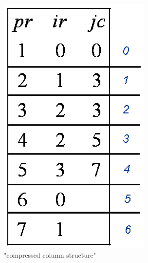 \begin{figure}[htbp]
\begin{center}
\begin{minipage}[t]{0.4\linewidth}
			\includegraphics[width=\linewidth]{../xby/pic/numerische_sparse2}
			\caption{"compressed column structure"}
			\label{numerische_sparse2}
		\end{minipage}
	\end{center}
\end{figure}